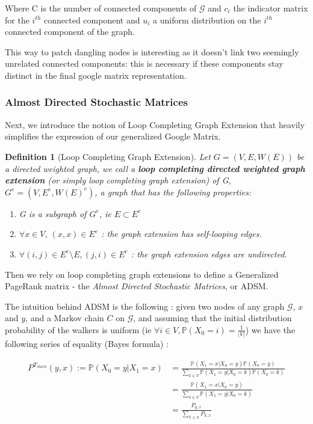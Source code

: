 \documentclass[sn-mathphys]{sn-jnl}%
\theoremstyle{thmstyleone}%
\theoremstyle{thmstyletwo}%
\theoremstyle{thmstylethree}%
\newtheorem{definition}[theo]{Definition}
\begin{document}
Where C is the number of connected components of $\mathcal{G}$ and
$c_{i}$ the indicator matrix for the $i^{th}$ connected component and
$u_i$ a uniform distribution on the $i^{th}$ connected component of
the graph.

This way to patch dangling nodes is interesting as it doesn't link two
seemingly unrelated connected components: this is necessary if these
components stay distinct in the final google matrix representation.

\subsubsection{Almost Directed Stochastic Matrices}
Next, we introduce the notion of Loop Completing Graph Extension that
heavily simplifies the expression of our generalized Google Matrix.

\begin{definition}[Loop Completing Graph Extension]
  Let $G = (V, E, W(E))$ be a directed weighted graph, we call a
  \textbf{loop completing directed weighted graph extension} (or
  simply loop completing graph extension) of G,
  $G^e = (V, E^e, W(E)^e)$, a graph that has the following properties:
\begin{enumerate}
    \item G is a subgraph of $G^e$, ie $E \subset E^e$
    \item $\forall x \in V$, $(x,x) \in E^e$ : the graph extension has self-looping edges.
    \item $\forall (i,j) \in E^e \setminus E, (j,i) \in E^e$ : the graph extension edges are undirected.
\end{enumerate}

\end{definition}

Then we rely on loop completing graph extensions to define a
Generalized PageRank matrix - the \textit{Almost Directed Stochastic
  Matrices}, or ADSM.

The intuition behind ADSM is the following : given two nodes of any
graph $\mathcal{G}$, $x$ and $y$, and a Markov chain $C$ on
$\mathcal{G}$, and assuming that the initial distribution probability
of the walkers is uniform (ie
$\forall i \in V, \mathbb{P}(X_0= i)= \frac{1}{|V|}$) we have the
following series of equality (Bayes formula) :

\begin{align}\label{eq:ADSM_intuition}
    P^{T_{stoch}}(y,x) := \mathbb{P}(X_0 = y | X_1 = x) &= \frac{\mathbb{P}(X_1=x | X_0 = y) \mathbb{P}(X_0 = y)}{\sum_{k\in V} \mathbb{P}(X_1 = y | X_0 = k) \mathbb{P}(X_0=k) } \\ 
    &= \frac{\mathbb{P}(X_1=x | X_0 = y)}{\sum_{k\in V} \mathbb{P}(X_1 = y | X_0 = k) } \\
    &= \frac{P_{y,x}}{\sum_{k\leq n} P_{k,x}}
\end{align}
\end{document}
